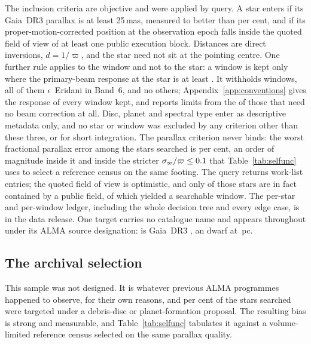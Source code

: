 The inclusion criteria are objective and were applied by query. A star enters
if its Gaia~DR3 parallax is at least 25\,mas, measured to better than
\PlxAdqlPct{} per cent, and if its proper-motion-corrected position at the
observation epoch falls inside the quoted field of view of at least one
public execution block. Distances are direct inversions, $d=1/\varpi$, and
the star need not sit at the pointing centre. One further rule applies to the
window and not to the star: a window is kept only where the primary-beam
response at the star is at least \PbFloorResp. It withholds \EpsEriNWin{}
windows, all of them $\epsilon$~Eridani in Band~6, and no others;
Appendix~\ref{app:conventions} gives the response of every window kept, and
reports limits from the \EpsEriNOnAxis{} of those \EpsEriNWin{} that need no
beam correction at all. Disc, planet and spectral type enter
as descriptive metadata only, and no star or window was excluded by any
criterion other than these three, or for short integration. The parallax
criterion never binds: the worst fractional parallax error among the stars
searched is \SfPlxWorstPct{} per cent, an order of magnitude inside it and
inside the stricter $\sigma_\varpi/\varpi\le0.1$ that
Table~\ref{tab:selfunc} uses to select a reference census on the same
footing. The query returns
\NCensus{} work-list entries; the quoted field of view is optimistic, and
only \NGenuinelyCovered{} of those stars are in fact contained by a public
field, of which \NStars{} yielded a searchable window. The per-star and
per-window ledger, including the whole decision tree and every edge
case, is in the data release. One target carries no catalogue name and
appears throughout under its ALMA source designation:
\BkAlmaName{} is Gaia~DR3 \BkAlmaGaia, an \BkAlmaSpType{} dwarf at
\BkAlmaDistPc\,pc.

\subsection{The archival selection}
\label{sec:bias}

This sample was not designed. It is whatever previous ALMA programmes
happened to observe, for their own reasons, and \PctDiscProposal{} per cent
of the stars searched were targeted under a debris-disc or planet-formation
proposal. The resulting bias is strong and measurable, and
Table~\ref{tab:selfunc} tabulates it against a volume-limited reference
census selected on the same parallax quality.

